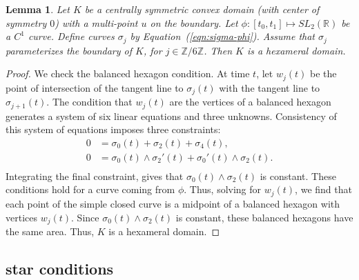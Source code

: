 \documentclass[11pt]{amsart}
\newtheorem{lemma}[equation]{Lemma}
\newcommand{\ring}[1]{\mathbb{#1}}
\begin{document}
\begin{lemma}\label{lemma:sl2-rein}  
Let $K$ be a centrally symmetric convex domain (with center of symmetry $0$) with a multi-point
$u$ on the boundary.
Let $\phi:[t_0,t_1]\mapsto SL_2(\ring{R})$ be a $C^1$ curve. %
Define curves $\sigma_j$ by Equation~(\ref{eqn:sigma-phi}).
Assume that $\sigma_j$ parameterizes
the boundary of $K$,
 for $j\in\ring{Z}/6\ring{Z}$.
Then
$K$ is a hexameral domain.
\end{lemma}

\begin{proof} 
  We check the balanced hexagon condition.  At time $t$, let $w_j(t)$
  be the point of intersection of the tangent line to $\sigma_j(t)$
  with the tangent line to $\sigma_{j+1}(t)$.  The condition that
  $w_j(t)$ are the vertices of a balanced hexagon generates a system
  of six linear equations and three unknowns.  Consistency of this
  system of equations imposes three constraints:
   $$
   \begin{array}{lll}
   0 &= \sigma_0(t) + \sigma_2(t) + \sigma_4(t),\\
   0 &= {\sigma_0(t)}\land{\sigma_2'(t)}+ {\sigma_0'(t)}\land{\sigma_2(t)}.\\
   \end{array}
   $$
Integrating the final constraint, gives that ${\sigma_0(t)}\land{\sigma_2(t)}$ is constant.  These conditions
hold for a curve coming from $\phi$.  Thus, solving for $w_j(t)$, we find that each point of the simple closed curve is a midpoint of a 
balanced hexagon with vertices $w
_j(t)$.  
Since ${\sigma_0(t)}\land{\sigma_2(t)}$ is constant, these balanced hexagons have the
same area.  Thus, $K$ is a hexameral domain.
\end{proof}

\subsection{star conditions}\label{sec:star}
\end{document}
